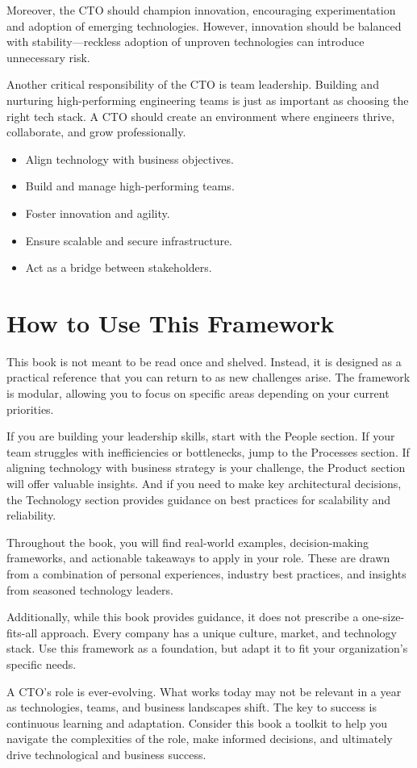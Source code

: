 Moreover, the CTO should champion innovation, encouraging experimentation and adoption of emerging technologies. However, innovation should be balanced with stability—reckless adoption of unproven technologies can introduce unnecessary risk.

Another critical responsibility of the CTO is team leadership. Building and nurturing high-performing engineering teams is just as important as choosing the right tech stack. A CTO should create an environment where engineers thrive, collaborate, and grow professionally.

\begin{itemize}
    \item Align technology with business objectives.
    \item Build and manage high-performing teams.
    \item Foster innovation and agility.
    \item Ensure scalable and secure infrastructure.
    \item Act as a bridge between stakeholders.
\end{itemize}

\section{How to Use This Framework}

This book is not meant to be read once and shelved. Instead, it is designed as a practical reference that you can return to as new challenges arise. The framework is modular, allowing you to focus on specific areas depending on your current priorities.

If you are building your leadership skills, start with the People section. If your team struggles with inefficiencies or bottlenecks, jump to the Processes section. If aligning technology with business strategy is your challenge, the Product section will offer valuable insights. And if you need to make key architectural decisions, the Technology section provides guidance on best practices for scalability and reliability.

Throughout the book, you will find real-world examples, decision-making frameworks, and actionable takeaways to apply in your role. These are drawn from a combination of personal experiences, industry best practices, and insights from seasoned technology leaders.

Additionally, while this book provides guidance, it does not prescribe a one-size-fits-all approach. Every company has a unique culture, market, and technology stack. Use this framework as a foundation, but adapt it to fit your organization's specific needs.

A CTO's role is ever-evolving. What works today may not be relevant in a year as technologies, teams, and business landscapes shift. The key to success is continuous learning and adaptation. Consider this book a toolkit to help you navigate the complexities of the role, make informed decisions, and ultimately drive technological and business success.


